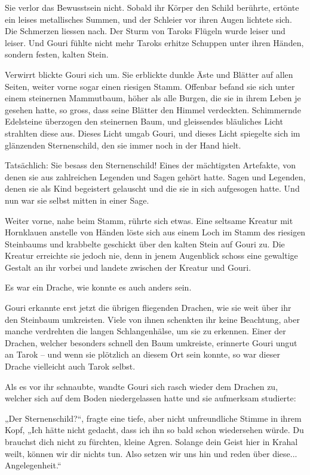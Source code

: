 Sie verlor das Bewusstsein nicht. Sobald ihr Körper den Schild berührte, ertönte ein leises metallisches Summen, und der Schleier vor ihren Augen lichtete sich. Die Schmerzen liessen nach. Der Sturm von Taroks Flügeln wurde leiser und leiser. Und Gouri fühlte nicht mehr Taroks erhitze Schuppen unter ihren Händen, sondern festen, kalten Stein.

Verwirrt blickte Gouri sich um. Sie erblickte dunkle Äste und Blätter auf allen Seiten, weiter vorne sogar einen riesigen Stamm. Offenbar befand sie sich unter einem steinernen Mammutbaum, höher als alle Burgen, die sie in ihrem Leben je gesehen hatte, so gross, dass seine Blätter den Himmel verdeckten. Schimmernde Edelsteine überzogen den steinernen Baum, und gleissendes bläuliches Licht strahlten diese aus. Dieses Licht umgab Gouri, und dieses Licht spiegelte sich im glänzenden Sternenschild, den sie immer noch in der Hand hielt.

Tatsächlich: Sie besass den Sternenschild! Eines der mächtigsten Artefakte, von denen sie aus zahlreichen Legenden und Sagen gehört hatte. Sagen und Legenden, denen sie als Kind begeistert gelauscht und die sie in sich aufgesogen hatte. Und nun war sie selbst mitten in einer Sage.

Weiter vorne, nahe beim Stamm, rührte sich etwas. Eine seltsame Kreatur mit Hornklauen anstelle von Händen löste sich aus einem Loch im Stamm des riesigen Steinbaums und krabbelte geschickt über den kalten Stein auf Gouri zu. Die Kreatur erreichte sie jedoch nie, denn in jenem Augenblick schoss eine gewaltige Gestalt an ihr vorbei und landete zwischen der Kreatur und Gouri.

Es war ein Drache, wie konnte es auch anders sein.

Gouri erkannte erst jetzt die übrigen fliegenden Drachen, wie sie weit über ihr den Steinbaum umkreisten. Viele von ihnen schenkten ihr keine Beachtung, aber manche verdrehten die langen Schlangenhälse, um sie zu erkennen. Einer der Drachen, welcher besonders schnell den Baum umkreiste, erinnerte Gouri ungut an Tarok – und wenn sie plötzlich an diesem Ort sein konnte, so war dieser Drache vielleicht auch Tarok selbst.

Als es vor ihr schnaubte, wandte Gouri sich rasch wieder dem Drachen zu, welcher sich auf dem Boden niedergelassen hatte und sie aufmerksam studierte:

„Der Sternenschild?“, fragte eine tiefe, aber nicht unfreundliche Stimme in ihrem Kopf, „Ich hätte nicht gedacht, dass ich ihn so bald schon wiedersehen würde. Du brauchst dich nicht zu fürchten, kleine Agren. Solange dein Geist hier in Krahal weilt, können wir dir nichts tun. Also setzen wir uns hin und reden über diese... Angelegenheit.“

